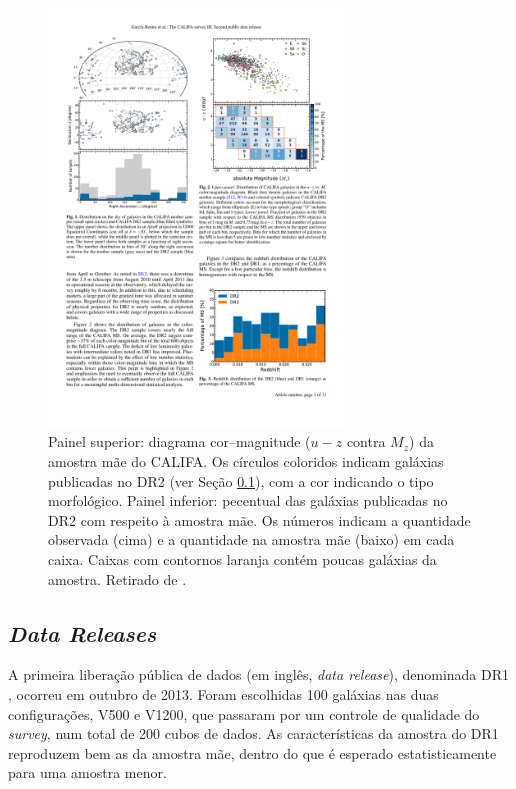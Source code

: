 \begin{figure}
	\includegraphics[width=0.7\textwidth]{figuras/CALIFACMD}
	\caption[Diagrama cor--magnitude da amostra mãe do CALIFA]
	{Painel superior: diagrama cor--magnitude ($u-z$ contra $M_z$) da amostra mãe
	do CALIFA. Os círculos coloridos indicam galáxias publicadas no DR2 (ver Seção
	\ref{sec:ifs:dr}), com a cor indicando o tipo morfológico. Painel inferior:
	pecentual das galáxias publicadas no DR2 com respeito à amostra mãe. Os números
	indicam a quantidade observada (cima) e a quantidade na amostra mãe (baixo) em
	cada caixa. Caixas com contornos laranja contém poucas galáxias da
	amostra. Retirado de
	\citet{GarciaBenito2015}.}
	\label{fig:CALIFACMD}
\end{figure}


\subsection{{\em Data Releases}}
\label{sec:ifs:dr}

A primeira liberação pública de dados (em inglês, {\em data release}),
denominada DR1 \citep{Husemann2013}, ocorreu em outubro de 2013. Foram
escolhidas 100 galáxias nas duas configurações, V500 e V1200, que passaram por
um controle de qualidade do {\em survey}, num total de 200 cubos de dados. As
características da amostra do DR1 reproduzem bem as da amostra mãe, dentro do
que é esperado estatisticamente para uma amostra menor.

